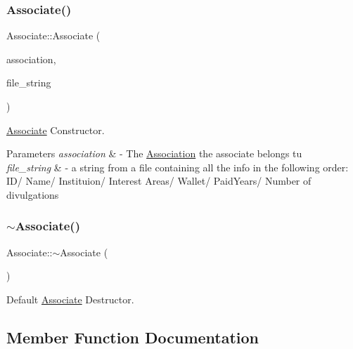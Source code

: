 \subsubsection{\texorpdfstring{Associate()}{Associate()}\hspace{0.1cm}{\footnotesize\ttfamily [3/3]}}
{\footnotesize\ttfamily Associate\+::\+Associate (\begin{DoxyParamCaption}\item[{\hyperlink{classAssociation}{Association} $\ast$}]{association,  }\item[{std\+::string}]{file\+\_\+string }\end{DoxyParamCaption})}



\hyperlink{classAssociate}{Associate} Constructor. 


\begin{DoxyParams}{Parameters}
{\em association} & -\/ The \hyperlink{classAssociation}{Association} the associate belongs tu \\
\hline
{\em file\+\_\+string} & -\/ a string from a file containing all the info in the following order\+: I\+D/ Name/ Instituion/ Interest Areas/ Wallet/ Paid\+Years/ Number of divulgations \\
\hline
\end{DoxyParams}
\mbox{\label{classAssociate_ae7f51b6f8b7e33af9e5218a2c7319a32}} 
\subsubsection{\texorpdfstring{$\sim$\+Associate()}{~Associate()}}
{\footnotesize\ttfamily Associate\+::$\sim$\+Associate (\begin{DoxyParamCaption}{ }\end{DoxyParamCaption})\hspace{0.3cm}{\ttfamily [virtual]}}



Default \hyperlink{classAssociate}{Associate} Destructor. 



\subsection{Member Function Documentation}
\mbox{\label{classAssociate_a147bd9c2b6148974d8c36f7a8f5b632a}} 
